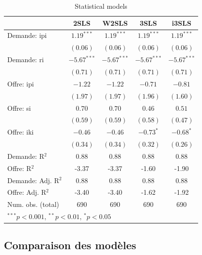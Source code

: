 \documentclass[11pt,]{article}
\begin{document}
\begin{table}
\begin{center}
\begin{tabular}{l c c c c }
\hline
 & 2SLS & W2SLS & 3SLS & i3SLS \\
\hline
Demande: ipi        & $1.19^{***}$  & $1.19^{***}$  & $1.19^{***}$  & $1.19^{***}$  \\
                    & $(0.06)$      & $(0.06)$      & $(0.06)$      & $(0.06)$      \\
Demande: ri         & $-5.67^{***}$ & $-5.67^{***}$ & $-5.67^{***}$ & $-5.67^{***}$ \\
                    & $(0.71)$      & $(0.71)$      & $(0.71)$      & $(0.71)$      \\
Offre: ipi          & $-1.22$       & $-1.22$       & $-0.71$       & $-0.81$       \\
                    & $(1.97)$      & $(1.97)$      & $(1.96)$      & $(1.60)$      \\
Offre: si           & $0.70$        & $0.70$        & $0.46$        & $0.51$        \\
                    & $(0.59)$      & $(0.59)$      & $(0.58)$      & $(0.47)$      \\
Offre: iki          & $-0.46$       & $-0.46$       & $-0.73^{*}$   & $-0.68^{*}$   \\
                    & $(0.34)$      & $(0.34)$      & $(0.32)$      & $(0.26)$      \\
\hline
Demande: R$^2$      & 0.88          & 0.88          & 0.88          & 0.88          \\
Offre: R$^2$        & -3.37         & -3.37         & -1.60         & -1.90         \\
Demande: Adj. R$^2$ & 0.88          & 0.88          & 0.88          & 0.88          \\
Offre: Adj. R$^2$   & -3.40         & -3.40         & -1.62         & -1.92         \\
Num. obs. (total)   & 690           & 690           & 690           & 690           \\
\hline
\multicolumn{5}{l}{\scriptsize{$^{***}p<0.001$, $^{**}p<0.01$, $^*p<0.05$}}
\end{tabular}
\caption{Statistical models}
\label{table : 2sls, w2sls, 3sls and fiml}
\end{center}
\end{table}

\FloatBarrier

\hypertarget{comparaison-des-modeles}{%
\subsection{Comparaison des modèles}\label{comparaison-des-modeles}}
\end{document}
